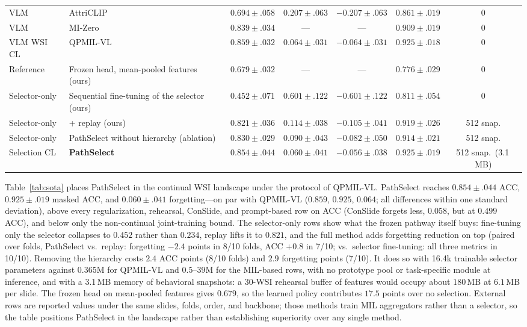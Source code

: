 \documentclass{article}
\begin{document}
\begin{table}[t]
\begin{tabular}{llccccc}
VLM & AttriCLIP \cite{wang2023attriclip} & $0.694{\pm}.058$ & $0.207{\pm}.063$ & $-0.207{\pm}.063$ & $0.861{\pm}.019$ & 0 \\
VLM & MI-Zero \cite{lu2023mizero} & $0.839{\pm}.034$ & --- & --- & $0.909{\pm}.019$ & 0 \\
VLM WSI CL & QPMIL-VL \cite{gou2025qpmil} & $0.859{\pm}.032$ & $0.064{\pm}.031$ & $-0.064{\pm}.031$ & $0.925{\pm}.018$ & 0 \\
\midrule
Reference & Frozen head, mean-pooled features (ours) & $0.679{\pm}.032$ & --- & --- & $0.776{\pm}.029$ & 0 \\
Selector-only & Sequential fine-tuning of the selector (ours) & $0.452{\pm}.071$ & $0.601{\pm}.122$ & $-0.601{\pm}.122$ & $0.811{\pm}.054$ & 0 \\
Selector-only & \quad + replay (ours) & $0.821{\pm}.036$ & $0.114{\pm}.038$ & $-0.105{\pm}.041$ & $0.919{\pm}.026$ & 512 snap. \\
Selector-only & PathSelect without hierarchy (ablation) & $0.830{\pm}.029$ & $0.090{\pm}.043$ & $-0.082{\pm}.050$ & $0.914{\pm}.021$ & 512 snap. \\
Selection CL & \textbf{PathSelect} & $\mathbf{0.854{\pm}.044}$ & $\mathbf{0.060{\pm}.041}$ & $\mathbf{-0.056{\pm}.038}$ & $\mathbf{0.925{\pm}.019}$ & 512 snap.\ (3.1\,MB) \\
\bottomrule
\end{tabular}
\end{table}

Table~\ref{tab:sota} places PathSelect in the continual WSI landscape under the protocol of QPMIL-VL. PathSelect reaches $0.854{\pm}.044$ ACC, $0.925{\pm}.019$ masked ACC, and $0.060{\pm}.041$ forgetting---on par with QPMIL-VL ($0.859$, $0.925$, $0.064$; all differences within one standard deviation), above every regularization, rehearsal, ConSlide, and prompt-based row on ACC (ConSlide forgets less, $0.058$, but at $0.499$ ACC), and below only the non-continual joint-training bound. The selector-only rows show what the frozen pathway itself buys: fine-tuning only the selector collapses to $0.452$ rather than $0.234$, replay lifts it to $0.821$, and the full method adds forgetting reduction on top (paired over folds, PathSelect vs.\ replay: forgetting $-2.4$ points in 8/10 folds, ACC $+0.8$ in 7/10; vs.\ selector fine-tuning: all three metrics in 10/10). Removing the hierarchy costs $2.4$ ACC points (8/10 folds) and $2.9$ forgetting points (7/10). It does so with 16.4k trainable selector parameters against $0.365$M for QPMIL-VL and $0.5$--$39$M for the MIL-based rows, with no prototype pool or task-specific module at inference, and with a 3.1\,MB memory of behavioral snapshots: a 30-WSI rehearsal buffer of features would occupy about $180$\,MB at $6.1$\,MB per slide. The frozen head on mean-pooled features gives $0.679$, so the learned policy contributes $17.5$ points over no selection. External rows are reported values under the same slides, folds, order, and backbone; those methods train MIL aggregators rather than a selector, so the table positions PathSelect in the landscape rather than establishing superiority over any single method.
\end{document}
